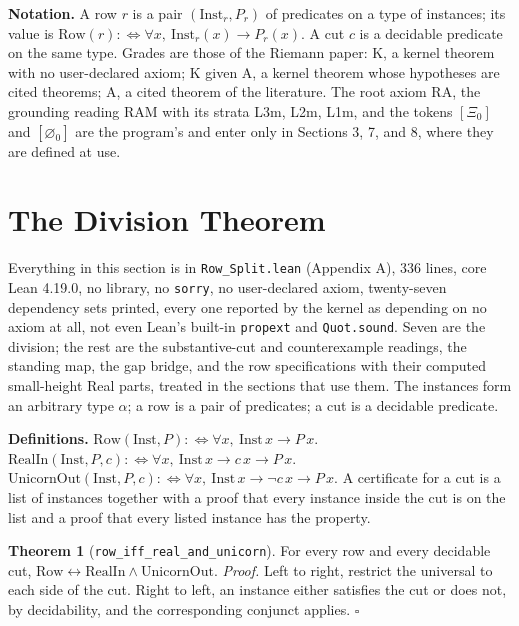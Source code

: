\documentclass[10pt,twocolumn]{article}
\begin{document}
\textbf{Notation.} A row \(r\) is a pair \((\mathrm{Inst}_r, P_r)\) of
predicates on a type of instances; its value is
\(\mathrm{Row}(r) :\Leftrightarrow \forall x,\ \mathrm{Inst}_r(x) \to P_r(x)\).
A cut \(c\) is a decidable predicate on the same type. Grades are those
of the Riemann paper: K, a kernel theorem with no user-declared axiom; K
given A, a kernel theorem whose hypotheses are cited theorems; A, a
cited theorem of the literature. The root axiom \(\mathrm{RA}\), the
grounding reading RAM with its strata L3m, L2m, L1m, and the tokens
\([\Xi_0]\) and \([\varnothing_0]\) are the program's and enter only in
Sections 3, 7, and 8, where they are defined at use.

\hypertarget{the-division-theorem}{%
\section{The Division Theorem}\label{the-division-theorem}}

Everything in this section is in \texttt{Row\_Split.lean} (Appendix A),
336 lines, core Lean 4.19.0, no library, no \texttt{sorry}, no
user-declared axiom, twenty-seven dependency sets printed, every one
reported by the kernel as depending on no axiom at all, not even Lean's
built-in \texttt{propext} and \texttt{Quot.sound}. Seven are the
division; the rest are the substantive-cut and counterexample readings,
the standing map, the gap bridge, and the row specifications with their
computed small-height Real parts, treated in the sections that use them.
The instances form an arbitrary type \(\alpha\); a row is a pair of
predicates; a cut is a decidable predicate.

\textbf{Definitions.}
\(\mathrm{Row}(\mathrm{Inst}, P) :\Leftrightarrow \forall x,\ \mathrm{Inst}\,x \to P\,x\).
\(\mathrm{RealIn}(\mathrm{Inst}, P, c) :\Leftrightarrow \forall x,\ \mathrm{Inst}\,x \to c\,x \to P\,x\).
\(\mathrm{UnicornOut}(\mathrm{Inst}, P, c) :\Leftrightarrow \forall x,\ \mathrm{Inst}\,x \to \neg c\,x \to P\,x\).
A certificate for a cut is a list of instances together with a proof
that every instance inside the cut is on the list and a proof that every
listed instance has the property.

\textbf{Theorem 1} (\texttt{row\_iff\_real\_and\_unicorn}). For every
row and every decidable cut,
\(\mathrm{Row} \leftrightarrow \mathrm{RealIn} \wedge \mathrm{UnicornOut}\).
\emph{Proof.} Left to right, restrict the universal to each side of the
cut. Right to left, an instance either satisfies the cut or does not, by
decidability, and the corresponding conjunct applies. \(\square\)
\end{document}
